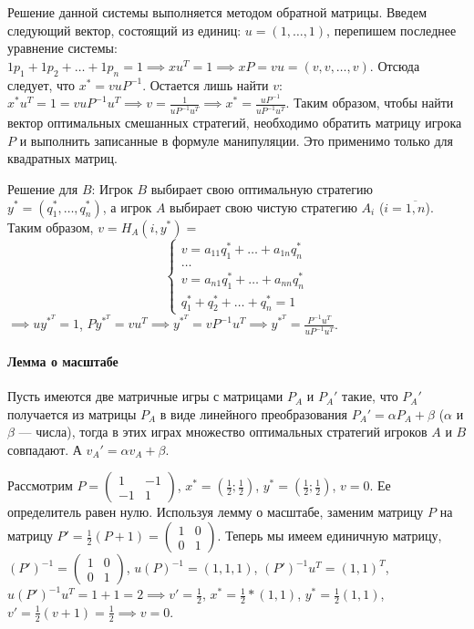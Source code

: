 \documentclass{article}
\begin{document}
Решение данной системы выполняется методом обратной матрицы. Введем следующий вектор, состоящий из единиц: $u = (1, \dots, 1)$, перепишем последнее уравнение системы: $1p_{1} + 1p_{2} + \dots + 1p_{n} = 1 \implies x u^{T} = 1 \implies xP = vu = (v, v, \dots, v)$. Отсюда следует, что $x^{*} = v u P^{-1}$. Остается лишь найти $v$: $x^{*} u^{T} = 1 = v u P^{-1} u^{T} \implies v = \frac{1}{u P^{-1} u^{T}} \implies x^{*} = \frac{u P^{-1}}{u P^{-1} u^{T}}$. Таким образом, чтобы найти вектор оптимальных смешанных стратегий, необходимо обратить матрицу игрока $P$ и выполнить записанные в формуле манипуляции. Это применимо только для квадратных матриц.

Решение для $B$: Игрок $B$ выбирает свою оптимальную стратегию $y^{*} = (q_{1}^{*}, \dots, q_{n}^{*})$, а игрок $A$ выбирает свою чистую стратегию $A_{i}$ ($i = \overline{1, n}$). Таким образом, $v = H_{A} (i, y^{*}) =$  \begin{equation}
    \begin{cases}
        v = a_{11} q_{1}^{*} + \dots + a_{1n} q_{n}^{*} \\
        \dots \\
        v = a_{n1} q_{1}^{*} + \dots + a_{n n} q_{n}^{*} \\
        q_{1}^{*} + q_{2}^{*} + \dots + q_{n}^{*} = 1
    \end{cases}
\end{equation} $\implies u y^{*^{T}} = 1$,  $P y^{*^{T}} = v u^{T} \implies y^{*^{T}} = v P^{-1} u^{T} \implies y^{*^{T}} = \frac{P^{-1} u^{T}}{u P^{-1} u^{T}}$.

\paragraph{Лемма о масштабе} Пусть имеются две матричные игры с матрицами $P_{A}$ и $P_{A}'$ такие, что $P_{A}'$ получается из матрицы $P_{A}$ в виде линейного преобразования $P_{A}' = \alpha P_{A} + \beta$ ($\alpha$ и $\beta$ — числа), тогда в этих играх множество оптимальных стратегий игроков $A$ и $B$ совпадают. А $v_{A}' = \alpha v_{A} + \beta$.

Рассмотрим $P = \begin{pmatrix}
    1 & -1 \\
    -1 & 1
\end{pmatrix}$, $x^{*} = (\frac{1}{2}; \frac{1}{2})$, $y^{*} = (\frac{1}{2}; \frac{1}{2})$, $v = 0$. Ее определитель равен нулю. Используя лемму о масштабе, заменим матрицу $P$ на матрицу $P' = \frac{1}{2} (P + 1) = \begin{pmatrix}
    1 & 0 \\
    0 & 1
\end{pmatrix}$. Теперь мы имеем единичную матрицу, $(P')^{-1} = \begin{pmatrix}
    1 & 0 \\
    0 & 1
\end{pmatrix}$, $u(P)^{-1} = (1, 1, 1)$, $(P')^{-1} u^{T} = (1, 1)^{T}$, $u(P')^{-1} u^{T} = 1 + 1 = 2 \implies v' = \frac{1}{2}$, $x^{*} = \frac{1}{2} * (1, 1)$, $y^{*} = \frac{1}{2} (1, 1)$, $v' = \frac{1}{2} (v + 1) = \frac{1}{2} \implies v = 0$.
\end{document}
